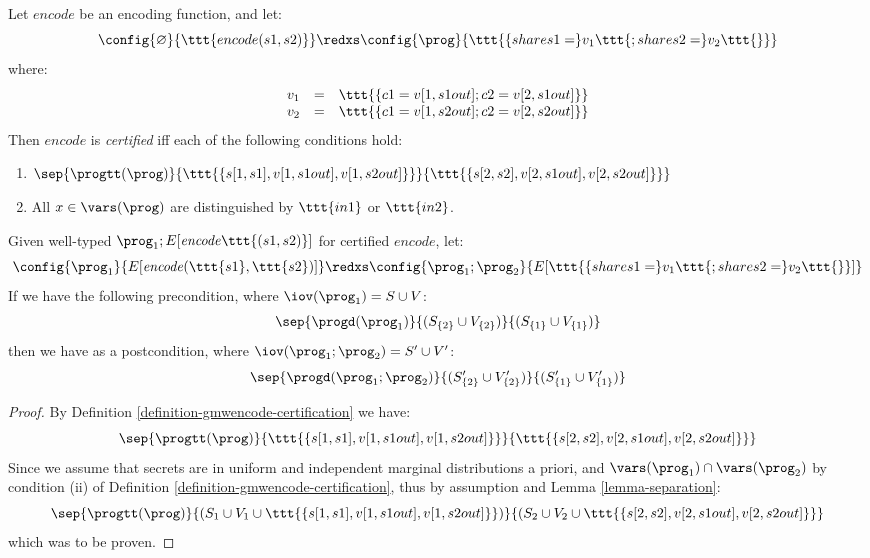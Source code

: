 \begin{definition}
  \label{definition-gmwencode-certification}
  Let $\mathit{encode}$ be an encoding function, and let:
  $$
  \config{\varnothing}{\ttt{encode(s1,s2)}} \redxs
  \config{\prog}{\ttt{\{shares1 = }v_1\ttt{; shares2 = }v_2\ttt{\}}}
  $$
  where:
  $$
  \begin{array}{rcl}
    v_1 &=& \ttt{\{ c1 = v[1,s1out]; c2 = v[2,s1out] \}}\\
    v_2 &=& \ttt{\{ c1 = v[1,s2out]; c2 = v[2,s2out] \}}
  \end{array}
  $$
  Then $\mathit{encode}$ is \emph{certified} iff each of the following conditions hold:
  \begin{enumerate}[\hspace{5mm}i.]
  \item $\sep{\progtt(\prog)}{\ttt{\{ s[1,s1],  v[1,s1out], v[1,s2out] \}}}{\ttt{\{ s[2,s2], v[2,s1out], v[2,s2out] \}}}$
  \item All $x \in \vars(\prog)$ are distinguished by $\ttt{in1}$ or $\ttt{in2}$. 
  \end{enumerate}
\end{definition}

\begin{lemma} 
  Given well-typed $\prog_1;E[\mathit{encode}\ttt{(s1,s2)}]$ for certified $\mathit{encode}$, let:
  $$
  \config{\prog_1}{E[\mathit{encode}(\ttt{s1},\ttt{s2})]} \redxs
  \config{\prog_1;\prog_2}{E[\ttt{\{shares1 = }v_1\ttt{; shares2 = }v_2\ttt{\}}]}
  $$
  If we have the following precondition, where $\iov(\prog_1) = S \cup V$:
  $$
  \sep{\progd(\prog_1)}{(S_{\{2\}} \cup V_{\{2\}})}{(S_{\{1\}} \cup V_{\{1\}})}
  $$
  then we have as a postcondition, where $\iov(\prog_1;\prog_2) = S' \cup V'$:
  $$
  \sep{\progd(\prog_1;\prog_2)}{(S'_{\{2\}} \cup V'_{\{2\}})}{(S'_{\{1\}} \cup V'_{\{1\}})}
  $$
\end{lemma}

\begin{proof}
  By Definition \ref{definition-gmwencode-certification} we have:
  $$\sep{\progtt(\prog)}{\ttt{\{ s[1,s1],  v[1,s1out], v[1,s2out] \}}}{\ttt{\{ s[2,s2], v[2,s1out], v[2,s2out] \}}}$$
  Since we assume that secrets are in uniform and independent marginal distributions a priori,
  and $\vars(\prog_1) \cap \vars(\prog_2)$ by condition (ii) of
  Definition \ref{definition-gmwencode-certification}, thus by assumption and Lemma \ref{lemma-separation}:
  $$\sep{\progtt(\prog)}{(S_1 \cup V_1 \cup \ttt{\{ s[1,s1],  v[1,s1out], v[1,s2out] \}})}{(S_2 \cup V_2 \cup \ttt{\{ s[2,s2], v[2,s1out], v[2,s2out] \}}}$$
  which was to be proven.
\end{proof}

